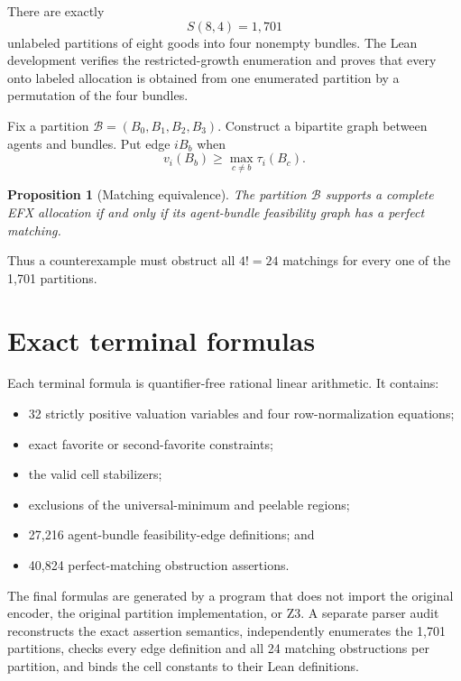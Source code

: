 \documentclass[11pt]{article}
\newtheorem{proposition}[theorem]{Proposition}
\theoremstyle{definition}
\begin{document}
There are exactly
\[
  S(8,4)=1,701
\]
unlabeled partitions of eight goods into four nonempty bundles. The Lean
development verifies the restricted-growth enumeration and proves that every
onto labeled allocation is obtained from one enumerated partition by a
permutation of the four bundles.

Fix a partition $\mathcal B=(B_0,B_1,B_2,B_3)$. Construct a bipartite graph
between agents and bundles. Put edge $iB_b$ when
\[
  v_i(B_b)\ge \max_{c\ne b}\tau_i(B_c).
\]

\begin{proposition}[Matching equivalence]\label{prop:matching}
The partition $\mathcal B$ supports a complete EFX allocation if and only if
its agent-bundle feasibility graph has a perfect matching.
\end{proposition}

Thus a counterexample must obstruct all $4!=24$ matchings for every one of
the 1,701 partitions.

\section{Exact terminal formulas}

Each terminal formula is quantifier-free rational linear arithmetic. It
contains:
\begin{itemize}[leftmargin=1.8em]
  \item 32 strictly positive valuation variables and four row-normalization
  equations;
  \item exact favorite or second-favorite constraints;
  \item the valid cell stabilizers;
  \item exclusions of the universal-minimum and peelable regions;
  \item 27,216 agent-bundle feasibility-edge definitions; and
  \item 40,824 perfect-matching obstruction assertions.
\end{itemize}

The final formulas are generated by a program that does not import the
original encoder, the original partition implementation, or Z3. A separate
parser audit reconstructs the exact assertion semantics, independently
enumerates the 1,701 partitions, checks every edge definition and all 24
matching obstructions per partition, and binds the cell constants to their
Lean definitions.
\end{document}

